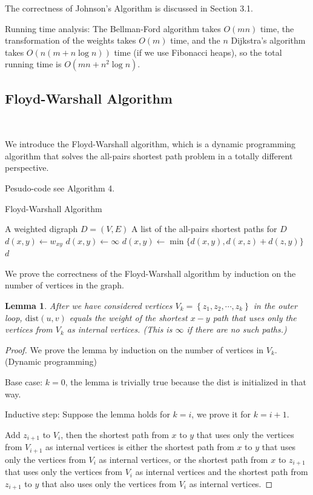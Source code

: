 \documentclass[11pt]{article}
\theoremstyle{plain}
\newtheorem{lemma}{Lemma}[section]
\begin{document}
  The correctness of Johnson's Algorithm is discussed in Section 3.1. 

  Running time analysis: The Bellman-Ford algorithm takes $O(mn)$ time, the transformation of the weights takes $O(m)$ time,
  and the $n$ Dijkstra's algorithm takes $O(n(m + n \log n))$ time (if we use Fibonacci heaps), so the total running time is $O(mn + n^{2} \log n)$.

\subsection{Floyd-Warshall Algorithm}\

We introduce the Floyd-Warshall algorithm, which is a dynamic programming algorithm that solves the all-pairs shortest path problem
in a totally different perspective. 

Pesudo-code see Algorithm 4.

\begin{algorithm}
  \caption{Floyd-Warshall Algorithm}
  \begin{algorithmic}[1]
  \REQUIRE A weighted digraph $D = (V, E)$
  \ENSURE A list of the all-pairs shortest paths for $D$
          \STATE $d(x, y) \leftarrow w_{xy}$
      \ELSE
          \STATE $d(x, y) \leftarrow \infty$
      \ENDIF
  \ENDFOR
              \STATE $d(x, y) \leftarrow \min\{d(x, y), d(x, z) + d(z, y)\}$
          \ENDFOR
      \ENDFOR
  \ENDFOR
  \RETURN $d$
  \end{algorithmic}
\end{algorithm}

We prove the correctness of the Floyd-Warshall algorithm by induction on the number of vertices in the graph.

\begin{lemma}
  After we have considered vertices $V_k = \left\{ z_1, z_2, \cdots, z_k \right\} $ in the outer loop, 
  $\text{dist}(u, v)$ equals the weight of the shortest $x-y$ path that uses
  only the vertices from $V_k$ as internal vertices. (This is $\infty$ if there are no such
  paths.)
\end{lemma}

\begin{proof}
  We prove the lemma by induction on the number of vertices in $V_k$. (Dynamic programming)

  Base case: $k = 0$, the lemma is trivially true because the dist is initialized in that way.

  Inductive step: Suppose the lemma holds for $k = i$, we prove it for $k = i + 1$.

  Add $z_{i+1}$ to $V_i$, then the shortest path from $x$ to $y$ that uses only the vertices from $V_{i+1}$ as internal vertices
  is either the shortest path from $x$ to $y$ that uses only the vertices from $V_i$ as internal vertices, or the shortest path from $x$ to $z_{i+1}$
  that uses only the vertices from $V_i$ as internal vertices and the shortest path from $z_{i+1}$ to $y$ that also uses only the vertices from $V_i$ as internal vertices.

\end{proof}
\end{document}
